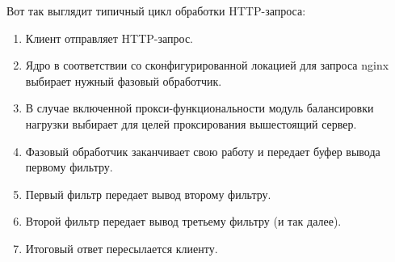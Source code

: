 \documentclass[14pt, a4paper]{article}
\begin{document}
Вот так выглядит типичный цикл обработки HTTP-запроса:
\begin{enumerate}
    \item Клиент отправляет HTTP-запрос.
    \item Ядро в соответствии со сконфигурированной локацией для запроса nginx выбирает нужный фазовый обработчик.
    \item В случае включенной прокси-функциональности модуль балансировки нагрузки 
    выбирает для целей проксирования вышестоящий сервер.
    \item Фазовый обработчик заканчивает свою работу и передает буфер вывода первому фильтру.
    \item Первый фильтр передает вывод второму фильтру.
    \item Второй фильтр передает вывод третьему фильтру (и так далее).
    \item Итоговый ответ пересылается клиенту.
\end{enumerate}
\end{document}
